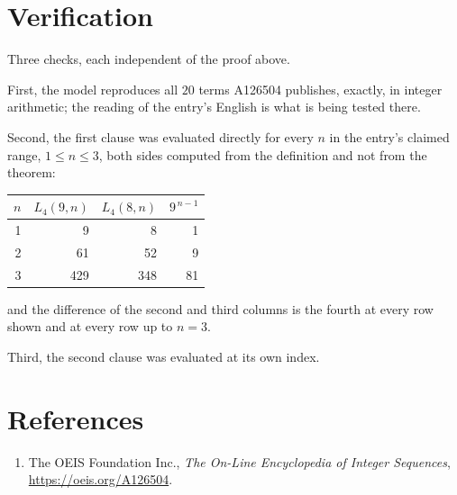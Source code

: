 \documentclass[11pt,a4paper]{article}
\theoremstyle{plain}
\theoremstyle{definition}
\begin{document}
\section{Verification}

Three checks, each independent of the proof above.

First, the model reproduces all $20$ terms A126504 publishes, exactly, in integer
arithmetic; the reading of the entry's English is what is being tested there.

Second, the first clause was evaluated directly for every $n$ in the entry's claimed range,
$1\le n\le3$, both sides computed from the definition and not from the theorem:

\begin{center}
\begin{tabular}{rrrr}
$n$ & $L_{4}(9,n)$ & $L_{4}(8,n)$ & $9^{\,n-1}$ \\ \hline
1 & 9 & 8 & 1 \\
2 & 61 & 52 & 9 \\
3 & 429 & 348 & 81 \\
\end{tabular}
\end{center}

\noindent and the difference of the second and third columns is the fourth at every row shown
and at every row up to $n=3$.

Third, the second clause was evaluated at its own index.

\section*{References}
\begin{enumerate}
\item The OEIS Foundation Inc., \emph{The On-Line Encyclopedia of Integer Sequences},
\url{https://oeis.org/A126504}.
\end{enumerate}
\end{document}
